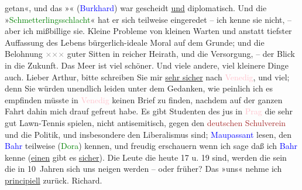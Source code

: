                    getan«, und das »\label{K_L00388_2v}\label{K_L00388_2h}« (\textcolor{blue}{Burkhard}{}\ledrightnote{\textcolor{blue}{Max Eugen Burckhard}})
                    war gescheidt \uline{und} diplomatisch. Und die
                        »\textcolor{green}{Schmetterlingsschlacht}{}\ledrightnote{\textcolor{green}{Die Schmetterlingsschlacht}}« hat er sich
                    teilweise eingeredet – ich kenne sie nicht, –
                    aber ich mißbillige sie. Kleine Probleme von
                    kleinen Warten und anstatt tiefster Auffassung des {\pb}Lebens bürgerlich-ideale
                    Moral auf dem Grunde; und die Belohnung \textcolor{gray}{×}\-\textcolor{gray}{×}\-\textcolor{gray}{×} guter Sitten in reicher Heirath, und die Versorgung, –
                    der Blick in die Zukunft.\pend
           \pstart
           Das Meer ist viel schöner. Und viele andere, viel kleinere Dinge auch. Lieber
                    Arthur, bitte schreiben Sie mir \uline{sehr sicher} nach
                        \textcolor{pink}{Venedig}{}\ledrightnote{\textcolor{pink}{Venedig}}, und viel; denn Sie würden
                    unendlich leiden unter dem Gedanken, wie peinlich ich es empfinden müsste in
                        \textcolor{pink}{Venedig}{}\ledrightnote{\textcolor{pink}{Venedig}} keinen Brief {\pb}zu finden, nachdem auf der
                    ganzen Fahrt dahin mich drauf gefreut habe.\pend
           \pstart
           Es gibt Studenten des jus in \textcolor{pink}{Prag}{}\ledrightnote{\textcolor{pink}{Prag}} die sehr
                    gut Lawn-Tennis spielen, nicht antisemitisch, gegen den \textcolor{brown}{deutschen Schulverein}{}\ledrightnote{\textcolor{brown}{Deutscher Schulverein}} und die Politik, und insbesondere den
                    Liberalismus sind; \textcolor{blue}{Maupassant}{}\ledrightnote{\textcolor{blue}{Guy de Maupassant}} lesen, den
                        \textcolor{blue}{Bahr}{}\ledrightnote{\textcolor{blue}{Hermann Bahr}} teilweise (\textcolor{green}{Dora}{}\ledrightnote{\textcolor{green}{Dora}}) kennen, und freudig erschauern wenn ich sage daß ich
                        \textcolor{blue}{Bahr}{}\ledrightnote{\textcolor{blue}{Hermann Bahr}} kenne (\uline{einen} gibt es \uline{sicher}). Die Leute die
                    heute 17 u. 19 sind, werden die sein die in 10 Jahren sich uns neigen werden –
                    oder früher? Das »uns« nehme ich \uline{principiell}
                    zurück. \spacefill\mbox{Richard.}\pend
           \endnumbering{}  
      